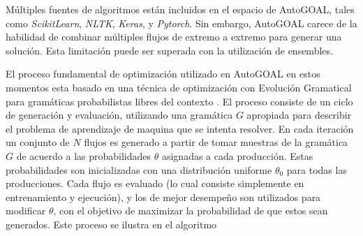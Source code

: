 Múltiples fuentes de algoritmos están incluidos en el espacio de AutoGOAL, tales como \textit{ScikitLearn}\parencite{pedregosa2011scikit}, \textit{NLTK}\parencite{nltk}, \textit{Keras}\parencite{chollet2015keras}, y \textit{Pytorch}\parencite{paszke2019pytorch}.
Sin embargo, AutoGOAL carece de la habilidad de combinar múltiples flujos de extremo a extremo para generar una solución.
Esta limitación puede ser superada con la utilización de ensembles.

El proceso fundamental de optimización utilizado en AutoGOAL en estos momentos esta basado en una técnica de optimización con Evolución Gramatical para gramáticas probabilistas libres del contexto \parencite{megane2021probabilistic}.
El proceso consiste de un ciclo de generación y evaluación, utilizando una gramática $G$ apropiada para describir el problema de aprendizaje de maquina que se intenta resolver.
En cada iteración un conjunto de $N$ flujos es generado a partir de tomar muestras de la gramática $G$ de acuerdo a las probabilidades $\theta$ asignadas a cada producción.
Estas probabilidades son inicializadas con una distribución uniforme $\theta_0$ para todas las producciones.
Cada flujo es evaluado (lo cual consiste simplemente en entrenamiento y ejecución), y los de mejor desempeño son utilizados para modificar $\theta$, con el objetivo de maximizar la probabilidad de que estos sean generados. Este proceso se ilustra en el algoritmo 

